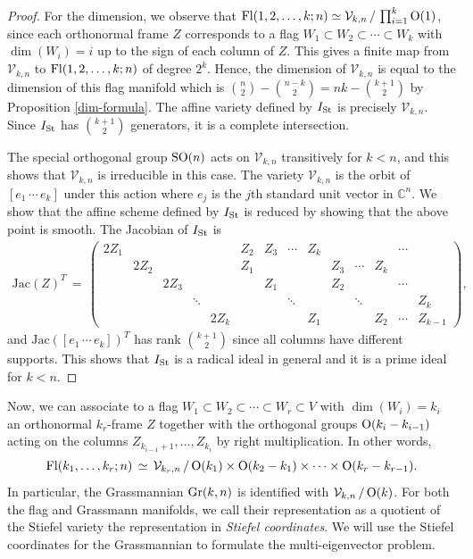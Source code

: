 \documentclass[12pt]{extarticle}
\theoremstyle{definition}
\numberwithin{theorem}{section}
\newcommand{\CC}{\mathbb{C}}
\begin{document}
\begin{proof}
 For the dimension, we observe that ${\rm Fl}(1,2,\ldots,k;n) \simeq \mathcal V_{k,n} \, / \, \prod_{i=1}^k {\rm O}(1)$, since each orthonormal frame $Z$ corresponds to a flag 
$W_1 \subset W_2 \subset \cdots \subset W_k$ with $\dim(W_i) = i$ up to the sign of each column of $Z$. This gives a finite map from $\mathcal V_{k,n}$ to ${\rm Fl}(1,2,\ldots, k;n)$ of degree $2^k$. Hence, the dimension of $\mathcal V_{k,n}$
is equal to the dimension of this flag manifold which is $\binom{n}{2} - \binom{n-k}{2} = nk - \binom{k+1}{2}$ by
Proposition \ref{dim-formula}.
The affine variety defined by $I_{\rm St}$ is precisely $\mathcal V_{k,n}$.
Since $I_{\rm St}$ has $\binom{k+1}{2}$ generators, it is a complete intersection. 

The special orthogonal group ${\rm SO}(n)$ acts on $\mathcal V_{k,n}$ transitively for $k<n$, and this shows that $\mathcal V_{k,n}$ is irreducible in this case. 
The variety $\mathcal V_{k,n}$ is the orbit of $[e_1 \, \cdots \, e_k]$ under this action where $e_j$ is the $j$th standard unit vector in $\CC^n$. We show that the affine scheme defined by $I_{\rm St}$ is reduced by showing that the above point is smooth. 
The Jacobian of $I_{\rm St}$ is 
\begin{align}\label{eq:stiefel-jac}
    \mathrm{Jac}(Z)^T \, = \, \left( \begin{array}{cccccccccccccc}
     2Z_1 &  &    &  &   & Z_2  & Z_3 & \cdots & Z_k &     &       &  & \cdots&  \\
          & 2Z_2 & & &   & Z_1  &     &        &     & Z_3 &\cdots &Z_k&  &   \\
          &     & 2Z_3&  &    & &Z_1 &        &     & Z_2 &      &     & \cdots&   \\ 
          &   &  & \ddots&     & & &   \ddots&     &     &\ddots &     &  &Z_k \\
      &    &     &  & 2Z_k&    & &           & Z_1 &     &       & Z_2 & \cdots & Z_{k-1}
    \end{array} \right),
  \end{align}
and $\mathrm{Jac}([e_1 \, \cdots \, e_k])^T$  has rank $\binom{k+1}{2}$ since all columns have different supports. This shows that $I_{\rm St}$ is a radical ideal in general and it is a prime ideal for $k<n$. 
\end{proof}
Now, we can associate to a flag $W_1 \subset W_2 \subset \cdots \subset W_r \subset V$ with $\dim(W_i) = k_i$ an orthonormal $k_r$-frame $Z$ together with the orthogonal groups ${\rm O}(k_i-k_{i-1})$ acting on the columns $Z_{k_{i-1} +1}, \ldots, Z_{k_i}$ by right multiplication. In other words, 
$${\rm Fl}(k_1, \ldots, k_r; n) \, \simeq \, 
\mathcal V_{k_r,n} \, / \, {\rm O}(k_1) \times {\rm O}(k_2-k_1) \times \cdots \times {\rm O}(k_r-k_{r-1}).$$
In particular, the Grassmannian ${\rm Gr}(k,n)$
is identified with $\mathcal V_{k,n} \, / \, {\rm O}(k)$. 
For both the flag and Grassmann manifolds, we  call their representation as a quotient of the Stiefel variety the representation in {\it Stiefel coordinates}. We will use the Stiefel coordinates for the Grassmannian to formulate the multi-eigenvector problem. 
\end{document}
